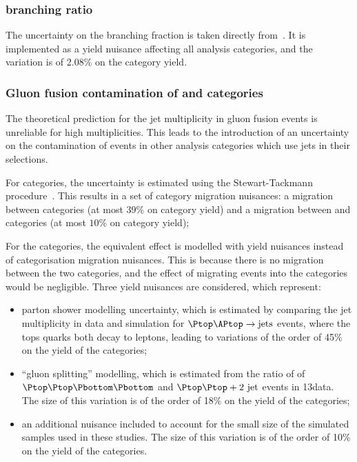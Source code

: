 \subsubsection{\Hgg branching ratio}
The uncertainty on the \SM \Hgg branching fraction is taken directly from~\cite{LHCHXSWGYR4}. It is implemented as a yield nuisance affecting all analysis categories, and the variation is of 2.08\% on the category yield.

\subsubsection{Gluon fusion contamination of \VBFTag and \TTHTag categories}
The theoretical prediction for the jet multiplicity in gluon fusion events is unreliable for high multiplicities. This leads to the introduction of an uncertainty on the contamination of \ggH events in other analysis categories which use jets in their selections. 

For \VBFTag categories, the uncertainty is estimated using the Stewart-Tackmann procedure~\cite{StewartTackmann}. This results in a set of category migration nuisances: a migration between \VBFTag categories (at most $39\%$ on category yield) and a migration between \Untagged and \VBFTag categories (at most $10\%$ on category yield); %

For the \TTHTag categories, the equivalent effect is modelled with yield nuisances instead of categorisation migration nuisances. This is because there is no migration between the two \TTHTag categories, and the effect of migrating events into the \Untagged categories would be negligible. Three yield nuisances are considered, which represent:
\begin{itemize}
\item parton shower modelling uncertainty, which is estimated by comparing the jet multiplicity in data and simulation for $\Ptop \APtop \rightarrow \text{jets}$ events, where the tops quarks both decay to leptons, leading to variations of the order of 45\% on the yield of the \TTHTag categories; 
\item ``gluon splitting'' modelling, which is estimated from the ratio of \crosssection\s of $\Ptop \Ptop \Pbottom \Pbottom$ and $\Ptop \Ptop +2\text{ jet}$ events in 13\TeV data. The size of this variation is of the order of 18\% on the yield of the \TTHTag categories;
\item an additional nuisance included to account for the small size of the simulated samples used in these studies. The size of this variation is of the order of 10\% on the yield of the \TTHTag categories.
\end{itemize}


